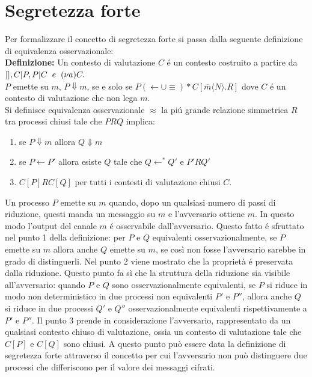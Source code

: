\documentclass[12pt]{report}
\begin{document}
\section*{Segretezza forte}
Per formalizzare il concetto di segretezza forte si passa dalla seguente definizione di equivalenza osservazionale:\\

\textbf{Definizione:}  Un contesto di valutazione $C$ é un contesto costruito a partire da $[], C | P, P|C \hspace{2mm}e\hspace{2mm} (\nu a)C.$\\
$P$ emette su $m$, $P \Downarrow m$, se e solo se $P (\leftarrow \cup \equiv)* C[\overline{m}\langle N \rangle.R]$ dove $C$ é un contesto di valutazione che non lega $m$.\\

Si definisce equivalenza osservazionale $\approx$ la piú grande relazione simmetrica $R$ tra processi chiusi tale che $PRQ$ implica:\\
\begin{enumerate}
    \item se $P \Downarrow m$ allora $Q \Downarrow m$
    \item se $P \leftarrow P'$ allora esiste $Q$ tale che $Q \leftarrow^* Q'$ e $P'RQ'$
    \item $C[P]RC[Q]$ per tutti i contesti di valutazione chiusi $C$.
\end{enumerate}
Un processo $P$ emette su $m$ quando, dopo un qualsiasi numero di passi di riduzione, questi manda un messaggio su $m$ e l'avversario ottiene $m$. In questo modo l'output del canale $m$ é osservabile dall'avversario. Questo fatto é sfruttato nel punto 1 della definizione: per $P$ e $Q$ equivalenti osservazionalmente, se $P$ emette su $m$ allora anche $Q$ emette su $m$, se così non fosse l'avversario sarebbe in grado di distinguerli. Nel punto 2 viene mostrato che la proprietà é preservata dalla riduzione. Questo punto fa sì che la struttura della riduzione sia visibile all'avversario: quando $P$ e $Q$ sono osservazionalmente equivalenti, se $P$ si riduce in modo non deterministico in due processi non equivalenti $P'$ e $P''$, allora anche $Q$ si riduce in due processi $Q'$ e $Q''$ osservazionalmente equivalenti rispettivamente a $P'$ e $P''$. Il punto 3 prende in considerazione l'avversario, rappresentato da un qualsiasi contesto chiuso di valutazione, ossia un contesto di valutazione tale che $C[P]$ e $C[Q]$ sono chiusi. A questo punto può essere data la definizione di segretezza forte attraverso il concetto per cui l'avversario non può distinguere due processi che differiscono per il valore dei messaggi cifrati.\\
\end{document}
